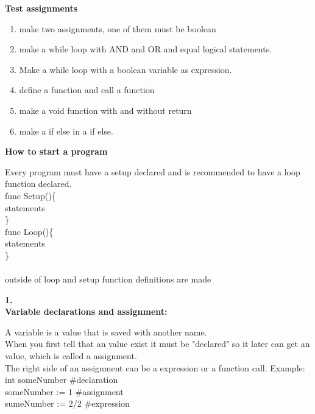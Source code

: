 \label{user_guide_appendix}

\textbf{Test assignments}
\begin{enumerate}
    \item make two assignments, one of them must be boolean
    \item make a while loop with AND and OR and equal logical statements. 
    \item Make a while loop with a boolean variable as expression.
    \item define a function and call a function
    \item make a void function with and without return
    \item make a if else in a if else.
\end{enumerate}
\begin{flushleft}
\textbf{How to start a program} 
\end{flushleft}
Every program must have a setup declared and is recommended to have a loop function declared. \\
func Setup()\{\\ 
\hspace*{1cm} statements\\
\}\\
func Loop()\{\\
\hspace*{1cm} statements\\
\}\\\\
outside of loop and setup function definitions are made
\begin{flushleft}
\textbf{1.}\\
\textbf{Variable declarations and assignment:}
\end{flushleft}
A variable is a value that is saved with another name.\\
When you first tell that an value exist it must be "declared" so it later can  get an value, which is called a assignment.\\
The right side of an assignment can be a expression or a function call.
Example:\\
int someNumber \hspace*{22mm}             \#declaration\\
someNumber := 1 \hspace*{20mm}            \#assignment\\
sumeNumber := 2/2 \hspace*{16mm}          \#expression\\
